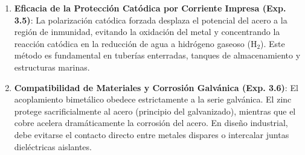 \documentclass[11pt,a4paper]{article}
\begin{document}
\begin{enumerate}
    \item \textbf{Eficacia de la Protección Catódica por Corriente Impresa (Exp. 3.5)}:
    La polarización catódica forzada desplaza el potencial del acero a la región de inmunidad, evitando la oxidación del metal y concentrando la reacción catódica en la reducción de agua a hidrógeno gaseoso ($\text{H}_2$). Este método es fundamental en tuberías enterradas, tanques de almacenamiento y estructuras marinas.

    \item \textbf{Compatibilidad de Materiales y Corrosión Galvánica (Exp. 3.6)}:
    El acoplamiento bimetálico obedece estrictamente a la serie galvánica. El zinc protege sacrificialmente al acero (principio del galvanizado), mientras que el cobre acelera dramáticamente la corrosión del acero. En diseño industrial, debe evitarse el contacto directo entre metales dispares o intercalar juntas dieléctricas aislantes.
\end{enumerate}
\end{document}

